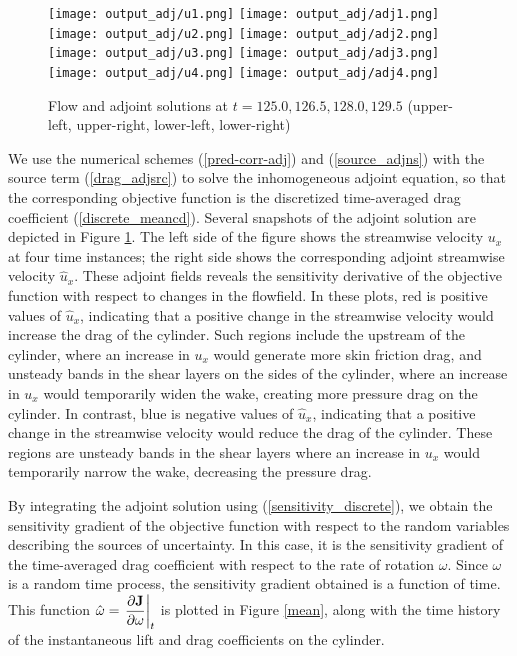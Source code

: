 \begin{figure}[htb!] \center
\texttt{[image: output\_adj/u1.png]}
\texttt{[image: output\_adj/adj1.png]}
\texttt{[image: output\_adj/u2.png]}
\texttt{[image: output\_adj/adj2.png]}
\texttt{[image: output\_adj/u3.png]}
\texttt{[image: output\_adj/adj3.png]}
\texttt{[image: output\_adj/u4.png]}
\texttt{[image: output\_adj/adj4.png]}
\caption{Flow and adjoint solutions at $t=125.0, 126.5, 128.0, 129.5$
(upper-left, upper-right, lower-left, lower-right)}
\label{solutions}
\end{figure}

We use the numerical schemes (\ref{pred-corr-adj}) and (\ref{source_adjns})
with the source term (\ref{drag_adjsrc}) to solve the inhomogeneous adjoint
equation, so that the corresponding objective function is the discretized
time-averaged drag coefficient (\ref{discrete_meancd}).
Several snapshots of the adjoint solution are depicted in
Figure \ref{solutions}.  The left side of the figure shows the streamwise
velocity $u_x$ at four time instances;
the right side shows the corresponding adjoint streamwise velocity
${\hat u}_x$.  These adjoint fields reveals the sensitivity derivative
of the objective function with respect to changes in the flowfield.
In these plots, red is positive values of ${\hat u}_x$, indicating that
a positive change in the streamwise velocity would increase the drag of
the cylinder.  Such regions include the upstream of the cylinder, where
an increase in $u_x$ would generate more skin friction drag,
and unsteady bands in the shear layers on the sides of the cylinder,
where an increase in $u_x$
would temporarily widen the wake, creating more pressure drag on the cylinder.
In contrast, blue is negative values of ${\hat u}_x$, indicating that a
positive change in the streamwise velocity would reduce the drag of the
cylinder.  These regions are unsteady bands in the shear layers where
an increase in $u_x$ would temporarily narrow the wake, decreasing the pressure
drag.

By integrating the adjoint solution using (\ref{sensitivity_discrete}), we
obtain the sensitivity gradient of the objective function with respect to
the random variables describing the sources of uncertainty.  In this case,
it is the sensitivity gradient of the time-averaged drag coefficient with
respect to the rate of rotation $\omega$.  Since $\omega$ is a random time
process, the sensitivity gradient obtained is a function of time.  This
function
${\hat \omega} = \left. \dfrac{\partial {\bf J}}{\partial \omega} \right|_t$
is plotted in Figure \ref{mean}, along with the time history of the
instantaneous lift and drag coefficients on the cylinder.

